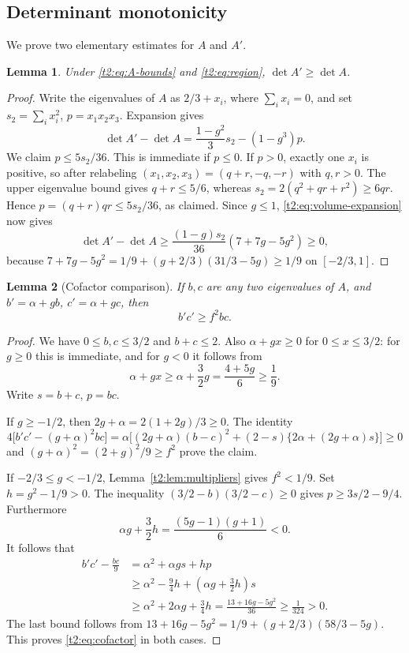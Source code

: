 \documentclass[11pt,a4paper]{article}
\newtheorem{lemma}{Lemma}
\begin{document}
\subsection{Determinant monotonicity}
We prove two elementary estimates for $A$ and $A'$.

\begin{lemma}\label{t2:lem:volume}
Under \eqref{t2:eq:A-bounds} and \eqref{t2:eq:region}, $\det A'\ge\det A$.
\end{lemma}
\begin{proof}
Write the eigenvalues of $A$ as $2/3+x_i$, where $\sum_i x_i=0$,
and set $s_2=\sum_i x_i^2$, $p=x_1x_2x_3$. Expansion gives
\begin{equation}\label{t2:eq:volume-expansion}
 \det A'-\det A=\frac{1-g^2}{3}s_2-(1-g^3)p.
\end{equation}
We claim $p\le5s_2/36$. This is immediate if $p\le0$.
If $p>0$, exactly one $x_i$ is positive, so after relabeling
$(x_1,x_2,x_3)=(q+r,-q,-r)$ with $q,r>0$.
The upper eigenvalue bound gives $q+r\le5/6$, whereas
$s_2=2(q^2+qr+r^2)\ge6qr$. Hence
$p=(q+r)qr\le5s_2/36$, as claimed.
Since $g\le1$, \eqref{t2:eq:volume-expansion} now gives
\[
 \det A'-\det A\ge
 \frac{(1-g)s_2}{36}(7+7g-5g^2)\ge0,
\]
because
$7+7g-5g^2=1/9+(g+2/3)(31/3-5g)\ge1/9$ on $[-2/3,1]$.
\end{proof}

\begin{lemma}[Cofactor comparison]\label{t2:lem:cofactor}
If $b,c$ are any two eigenvalues of $A$, and
$b'=\alpha+gb$, $c'=\alpha+gc$, then
\begin{equation}\label{t2:eq:cofactor}
 b'c'\ge f^2bc.
\end{equation}
\end{lemma}
\begin{proof}
We have $0\le b,c\le3/2$ and $b+c\le2$. Also
$\alpha+gx\ge0$ for $0\le x\le3/2$: for $g\ge0$ this is
immediate, and for $g<0$ it follows from
\begin{equation}\label{t2:eq:positive}
 \alpha+gx\ge\alpha+\frac32g=\frac{4+5g}{6}\ge\frac19.
\end{equation}
Write $s=b+c$, $p=bc$.

If $g\ge-1/2$, then $2g+\alpha=2(1+2g)/3\ge0$.
The identity
\[
 4\bigl[b'c'-(g+\alpha)^2bc\bigr]
 =\alpha\bigl[(2g+\alpha)(b-c)^2
       +(2-s)\{2\alpha+(2g+\alpha)s\}\bigr]\ge0
\]
and $(g+\alpha)^2=(2+g)^2/9\ge f^2$ prove the claim.

If $-2/3\le g<-1/2$, Lemma~\ref{t2:lem:multipliers} gives $f^2<1/9$.
Set $h=g^2-1/9>0$. The inequality
$(3/2-b)(3/2-c)\ge0$ gives $p\ge3s/2-9/4$.
Furthermore
\[
 \alpha g+\frac32h=\frac{(5g-1)(g+1)}6<0.
\]
It follows that
\begin{align*}
 b'c'-\frac{bc}{9}
 &=\alpha^2+\alpha gs+hp\\
 &\ge\alpha^2-\frac94h+
       \left(\alpha g+\frac32h\right)s\\
 &\ge\alpha^2+2\alpha g+\frac34h
   =\frac{13+16g-5g^2}{36}\ge\frac{1}{324}>0.
\end{align*}
The last bound follows from
$13+16g-5g^2=1/9+(g+2/3)(58/3-5g)$.
This proves \eqref{t2:eq:cofactor} in both cases.
\end{proof}
\end{document}
